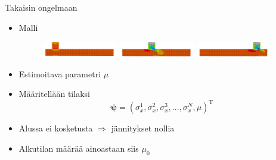 \documentclass{beamer}
\begin{document}
\begin{frame}{Takaisin ongelmaan}

\begin{itemize}
\item Malli
\begin{figure}
\includegraphics[width=3.3cm]{anim1.pdf}
\includegraphics[width=3.3cm]{anim3.pdf}
\includegraphics[width=3.3cm]{anim5.pdf}
\end{figure}

\item Estimoitava parametri $\mu$
\item Määritellään tilaksi
\[
  \boldsymbol{\psi} = (\sigma_x^1, \sigma_x^2, \sigma_x^3, \dots, \sigma_x^N, \mu)^\mathrm{T}
\]
\item Alussa ei kosketusta $\Rightarrow$ jännitykset nollia
\item Alkutilan määrää ainoastaan siis $\mu_0$
\end{itemize}

\end{frame}
\end{document}
